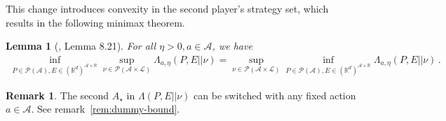 \documentclass{article}
\theoremstyle{plain}
\newtheorem{lemma}[theorem]{Lemma}
\theoremstyle{definition}
\newtheorem{remark}[theorem]{Remark}
\newcommand{\R}{\mathbb R}
\newcommand{\cL}{\mathcal L}
\newcommand{\cA}{\mathcal A}
\newcommand{\cP}{\mathcal P}
\begin{document}
This change introduces convexity in the second player's strategy set,
which results in the following minimax theorem.
\begin{lemma}[\cite{lattimore2024bandit}, Lemma 8.21]
    \label{lem:exp-by-opt-minimax}
    For all $\eta > 0, a \in \cA$,  we have
    \begin{align*}
        \inf_{P \in \cP(\cA), E \in (\R^d)^{\cA \times \R}}
        \sup_{\nu \in \cP(\cA \times \cL)}
        \Lambda_{a,\eta}(P, E || \nu)
        =
        \sup_{\nu \in \cP(\cA \times \cL)}
        \inf_{P \in \cP(\cA), E \in (\R^d)^{\cA \times \R}}
        \Lambda_{a,\eta}(P, E || \nu)\,.
    \end{align*}
\end{lemma}
\begin{remark}
    The second $A_\star$ in $\Lambda(P, E || \nu)$
    can be switched with any fixed action $a \in \cA$.
    See remark~\ref{rem:dummy-bound}.
\end{remark}
\end{document}

